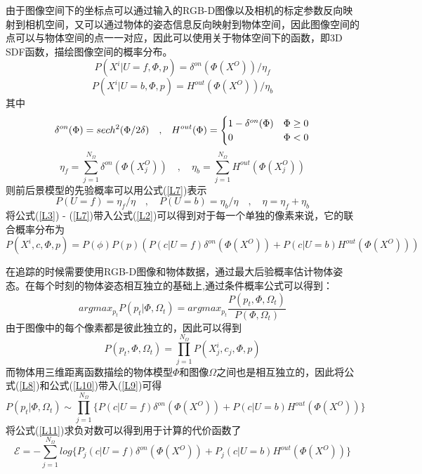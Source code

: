 由于图像空间下的坐标点可以通过输入的RGB-D图像以及相机的标定参数反向映射到相机空间，又可以通过物体的姿态信息反向映射到物体空间，因此图像空间的点可以与物体空间的点一一对应，因此可以使用关于物体空间下的函数，即3D SDF函数，描绘图像空间的概率分布。
\begin{equation}
 P(X^i|U=f, \Phi, p)=\delta^{on}(\Phi(X^O))/\eta_f\label{L3}
\end{equation}
\begin{equation}
 P(X^i|U=b, \Phi, p)=H^{out}(\Phi(X^O))/\eta_b\label{L4}
\end{equation}
其中
\begin{equation} \label{L5}
 \delta^{on}(\Phi)=sech^2(\Phi/2\delta) \quad\mathrm{,}\quad
 H^{out}(\Phi)=
 \begin{cases}
    1-\delta^{on}(\Phi) &\Phi\geq0\cr
    0 &\Phi<0
\end{cases}
\end{equation}
\begin{equation}\label{L6}
 \eta_f=\sum_{j=1}^{N_\Omega}\delta^{on}(\Phi(X_j^O))
\quad\mathrm{,}\quad
 \eta_b=\sum_{j=1}^{N_\Omega}H^{out}(\Phi(X_j^O))
\end{equation}
则前后景模型的先验概率可以用公式(\ref{L7})表示
\begin{equation}\label{L7}
 P(U=f)=\eta_f/\eta \quad\mathrm{,}\quad  P(U=b)=\eta_b/\eta \quad\mathrm{,}\quad  \eta=\eta_f+\eta_b
\end{equation}
将公式(\ref{L3}) - (\ref{L7})带入公式(\ref{L2})可以得到对于每一个单独的像素来说，它的联合概率分布为
\begin{equation}\label{L8}
 P(X^i, c, \Phi, p) = P(\phi)P(p)(P(c|U=f)\delta^{on}(\Phi(X^O)) + P(c|U=b)H^{out}(\Phi(X^O)))
\end{equation}

在追踪的时候需要使用RGB-D图像和物体数据，通过最大后验概率估计物体姿态。在每个时刻的物体姿态相互独立的基础上,通过条件概率公式可以得到：
\begin{equation}\label{L9}
argmax_{p_t}P(p_t|\Phi,\Omega_t) = argmax_{p_t}\frac{P(p_t,\Phi,\Omega_t)}{P(\Phi,\Omega_t)}
\end{equation}
由于图像中的每个像素都是彼此独立的，因此可以得到
\begin{equation}\label{L10}
P(p_t,\Phi,\Omega_t)=\prod_{j=1}^{N_\Omega}P(X_j^i, c_j, \Phi, p)
\end{equation}
而物体用三维距离函数描绘的物体模型$\Phi$和图像$\Omega$之间也是相互独立的，因此将公式(\ref{L8})和公式(\ref{L10})带入(\ref{L9})可得
\begin{equation}\label{L11}
P(p_t|\Phi,\Omega_t) \sim \prod_{j=1}^{N_\Omega}\Big\{P(c|U=f)\delta^{on}(\Phi(X^O)) + P(c|U=b)H^{out}(\Phi(X^O))\Big\}
\end{equation}
将公式(\ref{L11})求负对数可以得到用于计算的代价函数了
\begin{equation}\label{L12}
\mathscr{E} = -\sum_{j=1}^{N_\Omega}log\Big\{P_j(c|U=f)\delta^{on}(\Phi(X^O)) + P_j(c|U=b)H^{out}(\Phi(X^O))\Big\}
\end{equation}

